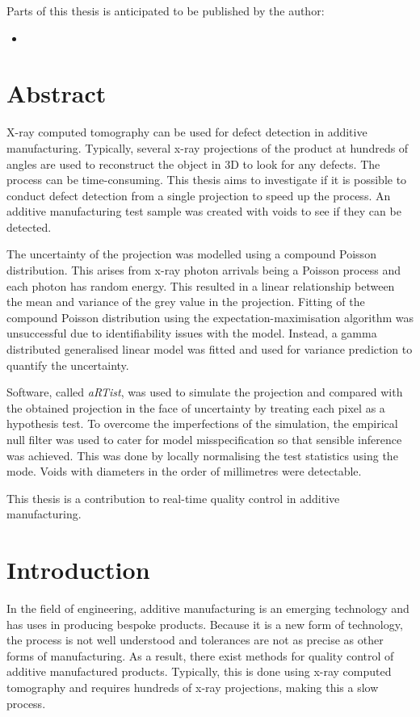\documentclass[12pt, a4paper, oneside]{memoir}
\begin{document}
Parts of this thesis is anticipated to be published by the author:
\begin{itemize}
  \item\nobibliography*{}
\end{itemize}

\chapter{Abstract}
X-ray computed tomography can be used for defect detection in additive manufacturing. Typically, several x-ray projections of the product at hundreds of angles are used to reconstruct the object in 3D to look for any defects. The process can be time-consuming. This thesis aims to investigate if it is possible to conduct defect detection from a single projection to speed up the process. An additive manufacturing test sample was created with voids to see if they can be detected.

The uncertainty of the projection was modelled using a compound Poisson distribution. This arises from x-ray photon arrivals being a Poisson process and each photon has random energy. This resulted in a linear relationship between the mean and variance of the grey value in the projection. Fitting of the compound Poisson distribution using the expectation-maximisation algorithm was unsuccessful due to identifiability issues with the model. Instead, a gamma distributed generalised linear model was fitted and used for variance prediction to quantify the uncertainty.

Software, called \emph{aRTist}, was used to simulate the projection and compared with the obtained projection in the face of uncertainty by treating each pixel as a hypothesis test. To overcome the imperfections of the simulation, the empirical null filter was used to cater for model misspecification so that sensible inference was achieved. This was done by locally normalising the test statistics using the mode. Voids with diameters in the order of millimetres were detectable.

This thesis is a contribution to real-time quality control in additive manufacturing.

\newpage

\mainmatter

\chapter{Introduction}

In the field of engineering, additive manufacturing is an emerging technology and has uses in producing bespoke products. Because it is a new form of technology, the process is not well understood and tolerances are not as precise as other forms of manufacturing. As a result, there exist methods for quality control of additive manufactured products. Typically, this is done using x-ray computed tomography and requires hundreds of x-ray projections, making this a slow process.
\end{document}
